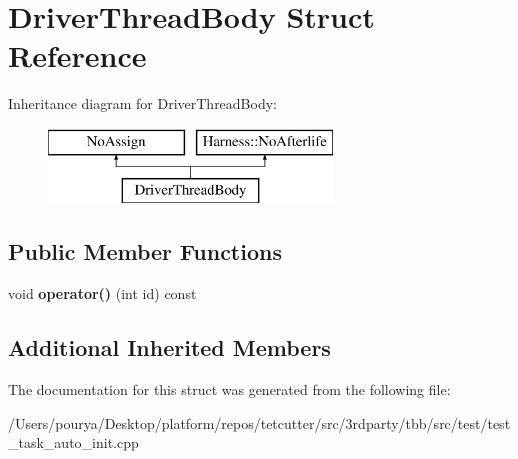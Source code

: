 \hypertarget{structDriverThreadBody}{}\section{Driver\+Thread\+Body Struct Reference}
\label{structDriverThreadBody}
Inheritance diagram for Driver\+Thread\+Body\+:\begin{figure}[H]
\begin{center}
\leavevmode
\includegraphics[height=2.000000cm]{structDriverThreadBody}
\end{center}
\end{figure}
\subsection*{Public Member Functions}
\begin{DoxyCompactItemize}
\item 
\hypertarget{structDriverThreadBody_a3adb03dad2708a47cd90229deab75eff}{}void {\bfseries operator()} (int id) const \label{structDriverThreadBody_a3adb03dad2708a47cd90229deab75eff}

\end{DoxyCompactItemize}
\subsection*{Additional Inherited Members}


The documentation for this struct was generated from the following file\+:\begin{DoxyCompactItemize}
\item 
/\+Users/pourya/\+Desktop/platform/repos/tetcutter/src/3rdparty/tbb/src/test/test\+\_\+task\+\_\+auto\+\_\+init.\+cpp\end{DoxyCompactItemize}
